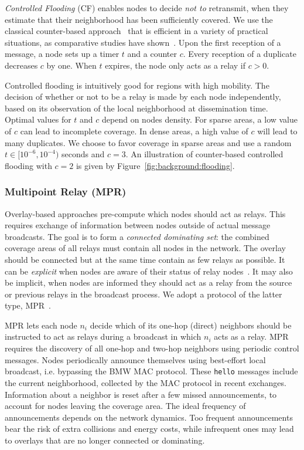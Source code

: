\emph{Controlled Flooding} (CF) enables nodes to decide \emph{not to} retransmit, when they estimate that their neighborhood has been sufficiently covered.
We use the classical counter-based approach~\cite{BroadcastStormProblem} that is efficient in a variety of practical situations, as comparative studies have shown~\cite{DensityMobDrivenEval,Williams2002}.
Upon the first reception of a message, a node sets up a timer $t$ and a counter $c$.
Every reception of a duplicate decreases $c$ by one.
When $t$ expires, the node only acts as a relay if $c>0$.

Controlled flooding is intuitively good for regions with high mobility.
The decision of whether or not to be a relay is made by each node independently, based on its observation of the local neighborhood at dissemination time.
Optimal values for $t$ and $c$ depend on nodes density.
For sparse areas, a low value of $c$ can lead to incomplete coverage.
In dense areas, a high value of $c$ will lead to many duplicates.
We choose to favor coverage in sparse areas and use a random $t \in [10^{-6}, 10^{-4})$ seconds and $c=3$.
An illustration of counter-based controlled flooding with $c=2$ is given by Figure~\ref{fig:background:flooding}.

\subsubsection{Multipoint Relay (MPR)}
\label{sec:background:broadcast:overlay}



Overlay-based approaches pre-compute which nodes should act as relays.
This requires exchange of information between nodes outside of actual message broadcasts.
The goal is to form a \emph{connected dominating set}:
the combined coverage areas of all relays must contain all nodes in the network.
The overlay should be connected but at the same time contain as few relays as possible.
It can be \emph{explicit} when nodes are aware of their status of relay nodes~\cite{stojmenovic-cds,Nikolov2015}.
It may also be implicit, when nodes are informed they should act as a relay from the source or previous relays in the broadcast process.
We adopt a protocol of the latter type, MPR~\cite{mpr}.

MPR lets each node $n_i$ decide which of its one-hop (direct) neighbors should be instructed to act as relays during a broadcast in which $n_i$ acts as a relay.
MPR requires the discovery of all one-hop and two-hop neighbors using periodic control messages.
Nodes periodically announce themselves using best-effort local broadcast, i.e. bypassing the BMW MAC protocol.
These \texttt{hello} messages include the current neighborhood, collected by the MAC protocol in recent exchanges.
Information about a neighbor is reset after a few missed announcements, to account for nodes leaving the coverage area.
The ideal frequency of announcements depends on the network dynamics.
Too frequent announcements bear the risk of extra collisions and energy costs, while infrequent ones may lead to overlays that are no longer connected or dominating.


